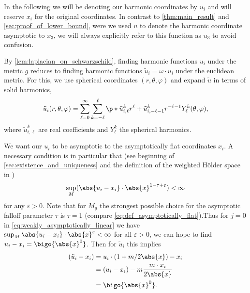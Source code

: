 \documentclass[titlepage,numbers=noenddot,oneside,%
cleardoublepage=empty,paper=a4,fontsize=11pt,%
english,%
]{scrartcl}
\begin{document}
\begin{remark}
    In the following we will be denoting our harmonic coordinates by \( u_i \) and will reserve \( x_i \) for the original coordinates. In contrast to \cref{thm:main_result} and \cref{sec:proof_of_lower_bound}, were we used \( u \) to denote the harmonic coordinate asymptotic to \( x_3 \), we will always explicitly refer to this function as \( u_3 \) to avoid confusion.
\end{remark}
By \cref{lem:laplacian_on_schwarzschild}, finding harmonic functions \( u_i \) under the metric \( g \) reduces to finding harmonic functions \( \tilde{u}_i=\omega \cdot u_i \) under the euclidean metric. For this, we use spherical coordinates \( (r,\theta,\varphi) \) and expand \( \tilde{u} \) in terms of solid harmonics,
\begin{equation*}
    \tilde{u}_i(r,\theta,\varphi)=\sum_{\ell=0}^\infty \sum_{k=-\ell}^\ell \p*{\tilde{u}^k_{i,\ell} r^\ell + \tilde{u}^k_{i,-\ell-1} r^{-\ell-1}}Y^k_{\ell}(\theta,\varphi),
\end{equation*}
where \( \tilde{u}^k_{i,\ell} \) are real coefficients and \( Y^k_{\ell} \) the spherical harmonics.

We want our \( u_i \) to be asymptotic to the asymptotically flat coordinates \( x_i \). A necessary condition is in particular that (see beginning of \cref{sec:existence_and_uniqueness} and the definition of the weighted Hölder space in \cite[Section 3]{almarazPositiveMassTheorem2016})
\begin{equation}\label{eq:weakly_asymptotically_linear}
    \sup_M (\abs{u_i-x_i} \cdot\abs{x}^{1-\tau+\varepsilon})<\infty
\end{equation}
for any \( \varepsilon>0 \). Note that for \( M_g \) the strongest possible choice for the asymptotic falloff parameter \( \tau \) is \( \tau=1 \) (compare \cref{eq:def_asymptotically_flat}).Thus for \( j=0 \) in \cref{eq:weakly_asymptotically_linear} we have \( \sup_M \abs{u_i-x_i}\cdot \abs{x}^\varepsilon<\infty \) for all \( \varepsilon>0 \), \ie we can hope to find \( u_i-x_i=\bigo{\abs{x}^0} \). Then for \( \tilde{u}_i \) this implies
\begin{equation*}
    \begin{aligned}[t]
        (\tilde{u}_i-x_i)&=u_i\cdot (1+m/2\abs{x})-x_i\\
        &=(u_i-x_i)-m\frac{m\cdot x_i}{2\abs{x}}\\
        &=\bigo{\abs{x}^0}.
    \end{aligned}
\end{equation*}
\end{document}

